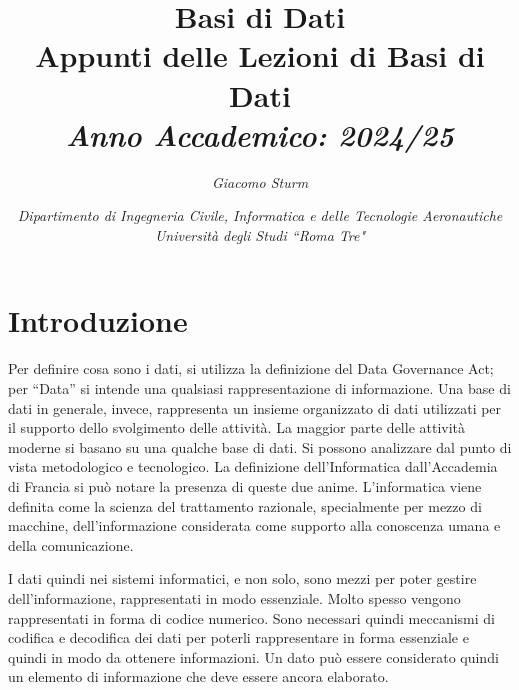 \documentclass{article}
\numberwithin{equation}{subsection}
\begin{document}
\title{%
    \textbf{Basi di Dati}  \\ 
    \large Appunti delle Lezioni di Basi di Dati \\
    \textit{Anno Accademico: 2024/25}}
\author{\textit{Giacomo Sturm}}
\date{\textit{Dipartimento di Ingegneria Civile, Informatica e delle Tecnologie Aeronautiche \\
Università degli Studi ``Roma Tre"}}

\maketitle
\thispagestyle{link}

\clearpage


\pagestyle{fancy}
\fancyhead{}\fancyfoot{}
\fancyfoot[C]{\thepage}

\tableofcontents

\clearpage
{}

\section{Introduzione}

Per definire cosa sono i dati, si utilizza la definizione del Data Governance Act; per ``Data'' si intende una qualsiasi rappresentazione di informazione. 
Una base di dati in generale, invece, rappresenta un insieme organizzato di dati utilizzati per il supporto dello svolgimento delle attività. La maggior parte delle 
attività moderne si basano su una qualche base di dati. 
Si possono analizzare dal punto di vista metodologico e tecnologico. La definizione dell'Informatica dall'Accademia di Francia si può notare la presenza di queste due 
anime. L'informatica viene definita come la scienza del trattamento razionale, specialmente per mezzo di macchine, dell'informazione considerata come supporto alla 
conoscenza umana e della comunicazione. 



I dati quindi nei sistemi informatici, e non solo, sono mezzi per poter gestire dell'informazione, rappresentati in modo essenziale. Molto spesso vengono rappresentati 
in forma di codice numerico. Sono necessari quindi meccanismi di codifica e decodifica dei dati per poterli rappresentare in forma essenziale e quindi in modo da 
ottenere informazioni. Un dato può essere considerato quindi un elemento di informazione che deve essere ancora elaborato. 
\end{document}
